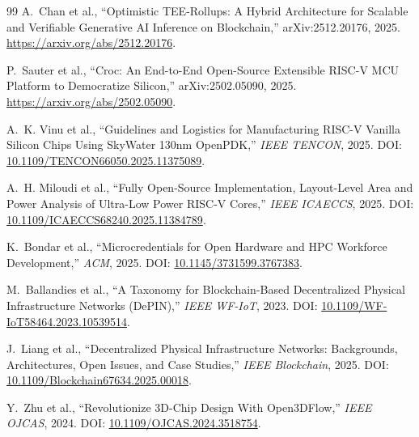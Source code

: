 \begin{thebibliography}{99}
A.~Chan et al.,
``Optimistic TEE-Rollups: A Hybrid Architecture for Scalable and Verifiable
Generative AI Inference on Blockchain,''
arXiv:2512.20176, 2025.
\url{https://arxiv.org/abs/2512.20176}.

P.~Sauter et al.,
``Croc: An End-to-End Open-Source Extensible RISC-V MCU Platform to
Democratize Silicon,''
arXiv:2502.05090, 2025.
\url{https://arxiv.org/abs/2502.05090}.

A.~K. Vinu et al.,
``Guidelines and Logistics for Manufacturing RISC-V Vanilla Silicon Chips Using
SkyWater 130nm OpenPDK,''
\textit{IEEE TENCON}, 2025.
DOI: \href{https://doi.org/10.1109/TENCON66050.2025.11375089}{10.1109/TENCON66050.2025.11375089}.

A.~H. Miloudi et al.,
``Fully Open-Source Implementation, Layout-Level Area and Power Analysis of
Ultra-Low Power RISC-V Cores,''
\textit{IEEE ICAECCS}, 2025.
DOI: \href{https://doi.org/10.1109/ICAECCS68240.2025.11384789}{10.1109/ICAECCS68240.2025.11384789}.

K.~Bondar et al.,
``Microcredentials for Open Hardware and HPC Workforce Development,''
\textit{ACM}, 2025.
DOI: \href{https://doi.org/10.1145/3731599.3767383}{10.1145/3731599.3767383}.

M.~Ballandies et al.,
``A Taxonomy for Blockchain-Based Decentralized Physical Infrastructure Networks
(DePIN),''
\textit{IEEE WF-IoT}, 2023.
DOI: \href{https://doi.org/10.1109/WF-IoT58464.2023.10539514}{10.1109/WF-IoT58464.2023.10539514}.

J.~Liang et al.,
``Decentralized Physical Infrastructure Networks: Backgrounds, Architectures,
Open Issues, and Case Studies,''
\textit{IEEE Blockchain}, 2025.
DOI: \href{https://doi.org/10.1109/Blockchain67634.2025.00018}{10.1109/Blockchain67634.2025.00018}.

Y.~Zhu et al.,
``Revolutionize 3D-Chip Design With Open3DFlow,''
\textit{IEEE OJCAS}, 2024.
DOI: \href{https://doi.org/10.1109/OJCAS.2024.3518754}{10.1109/OJCAS.2024.3518754}.

\end{thebibliography}


